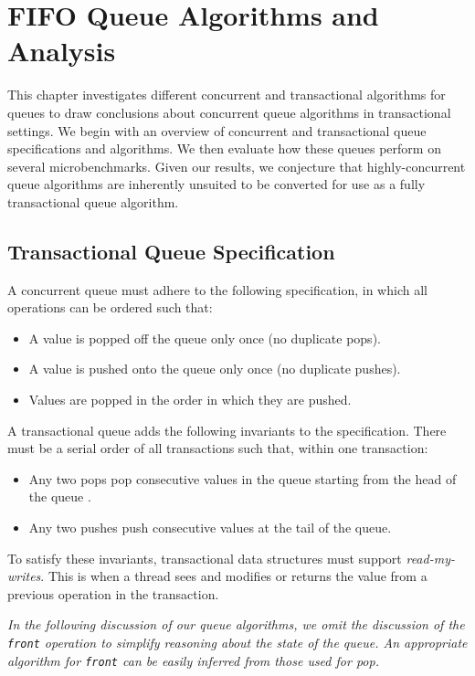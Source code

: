 \chapter{FIFO Queue Algorithms and Analysis}
\label{Queue}

This chapter investigates different concurrent and transactional algorithms for queues to draw conclusions about concurrent queue algorithms in transactional settings. We begin with an overview of concurrent and transactional queue specifications and algorithms. We then evaluate how these queues perform on several microbenchmarks. Given our results, we conjecture that highly-concurrent queue algorithms are inherently unsuited to be converted for use as a fully transactional queue algorithm.

\section{Transactional Queue Specification}

A concurrent queue must adhere to the following specification, in which all operations can be ordered such that:
\begin{itemize}
    \item A value is popped off the queue only once (no duplicate pops).
    \item A value is pushed onto the queue only once (no duplicate pushes).
    \item Values are popped in the order in which they are pushed.
\end{itemize}

A transactional queue adds the following invariants to the specification. There must be a serial order of all transactions such that, within one transaction:
\begin{itemize}
    \item Any two pops pop consecutive values in the queue starting from the head of the queue .
    \item Any two pushes push consecutive values at the tail of the queue.
\end{itemize}

To satisfy these invariants, transactional data structures must support \emph{read-my-writes}. This is when a thread sees and modifies or returns the value from a previous operation in the transaction.


\emph{In the following discussion of our queue algorithms, we omit the discussion of the \texttt{front} operation to simplify reasoning about the state of the queue. An appropriate algorithm for \texttt{front} can be easily inferred from those used for pop.}

